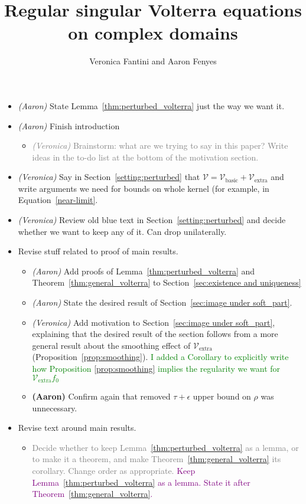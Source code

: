 \documentclass{article}
\title{Regular singular Volterra equations on complex domains}
\author{Veronica Fantini and Aaron Fenyes}
\date{}
\theoremstyle{plain}
\newcommand{\volterra}{\mathcal{V}}
\newcommand{\hardpart}{\mathcal{V}_\text{basic}}
\newcommand{\softpart}{\mathcal{V}_\text{extra}}
\newenvironment{brainstorm}{\color{violet}\begin{itemize}}{\end{itemize}\color{black}}
\begin{document}
\maketitle
\begin{brainstorm}
\item \textit{(Aaron)} State Lemma~\ref{thm:perturbed_volterra} just the way we want it.
\item \textit{(Aaron)} Finish introduction
\begin{itemize}
\item \textcolor{gray}{\textit{(Veronica)} Brainstorm: what are we trying to say in this paper? Write ideas in the to-do list at the bottom of the motivation section.}
\end{itemize}
\color{gray}
\item \textit{(Veronica)} Say in Section~\ref{setting:perturbed} that $\volterra = \hardpart + \softpart$ and write arguments we need for bounds on whole kernel (for example, in Equation~\ref{near-limit}.
\color{gray}
\item \textit{(Veronica)} Review old blue text in Section~\ref{setting:perturbed} and decide whether we want to keep any of it. Can drop unilaterally. 
\color{violet}
\item Revise stuff related to proof of main results.
\begin{itemize}
        \item \textit{(Aaron)} Add proofs of Lemma~\ref{thm:perturbed_volterra} and Theorem~\ref{thm:general_volterra} to Section~\ref{sec:existence and uniqueness}
        \item \textit{(Aaron)} State the desired result of Section~\ref{sec:image under soft_part}.
        \color{gray}
        \item \textit{(Veronica)} Add motivation to Section~\ref{sec:image under soft_part}, explaining that the desired result of the section follows from a more general result about the smoothing effect of $\softpart$ (Proposition~\ref{prop:smoothing}). \textcolor{green}{I added a Corollary to explicitly write how Proposition \ref{prop:smoothing} implies the regularity we want for $\softpart f_0$}
        \color{violet}
        \item \textbf{(Aaron)} Confirm again that removed $\tau+\epsilon$ upper bound on $\rho$ was unnecessary.
\end{itemize}
\item Revise text around main results.
\begin{itemize}
    \item \textcolor{gray}{Decide whether to keep Lemma~\ref{thm:perturbed_volterra} as a lemma, or to make it a theorem, and make Theorem~\ref{thm:general_volterra} its corollary. Change order as appropriate.} \textcolor{purple}{Keep Lemma~\ref{thm:perturbed_volterra} as a lemma. State it after Theorem~\ref{thm:general_volterra}.}

\end{itemize}
\end{brainstorm}
\end{document}
